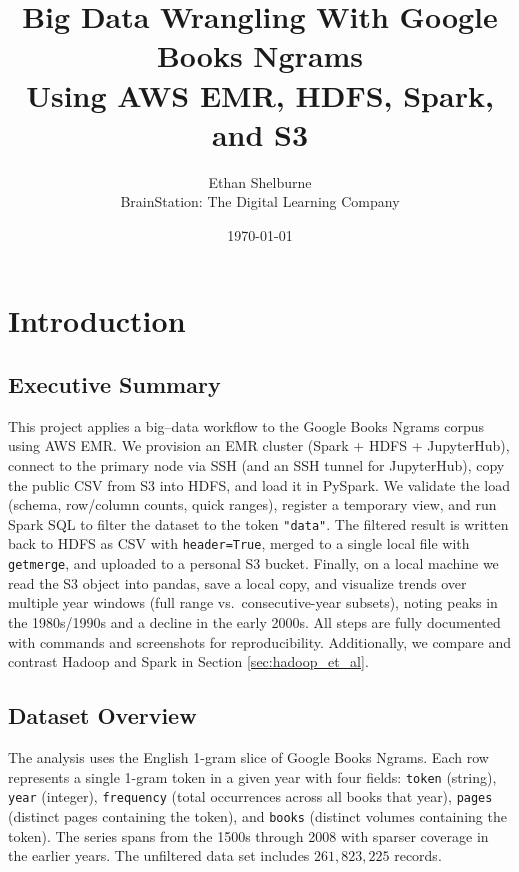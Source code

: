 \documentclass[11pt]{article}
\title{\vspace{-1.5em}\textbf{Big Data Wrangling With Google Books Ngrams}\\\large Using AWS EMR, HDFS, Spark, and S3}
\author{Ethan Shelburne \\ BrainStation: The Digital Learning Company}
\date{\today}
\begin{document}
\maketitle
\thispagestyle{fancy}


\tableofcontents
\listoffigures

\newpage



\section{Introduction}

\subsection{Executive Summary}
\label{sec:exec}
This project applies a big–data workflow to the Google Books Ngrams corpus using AWS EMR. We provision an EMR cluster (Spark + HDFS + JupyterHub), connect to the primary node via SSH (and an SSH tunnel for JupyterHub), copy the public CSV from S3 into HDFS, and load it in PySpark. We validate the load (schema, row/column counts, quick ranges), register a temporary view, and run Spark SQL to filter the dataset to the token \texttt{"data"}. The filtered result is written back to HDFS as CSV with \texttt{header=True}, merged to a single local file with \texttt{getmerge}, and uploaded to a personal S3 bucket. Finally, on a local machine we read the S3 object into pandas, save a local copy, and visualize trends over multiple year windows (full range vs.\ consecutive-year subsets), noting peaks in the 1980s/1990s and a decline in the early 2000s. All steps are fully documented with commands and screenshots for reproducibility. Additionally, we compare and contrast Hadoop and Spark in Section \ref{sec:hadoop_et_al}.

\subsection{Dataset Overview}
\label{sec:data_overview}
The analysis uses the English 1-gram slice of Google Books Ngrams. Each row represents a single 1-gram token in a given year with four fields: \texttt{token} (string), \texttt{year} (integer), \texttt{frequency} (total occurrences across all books that year), \texttt{pages} (distinct pages containing the token), and \texttt{books} (distinct volumes containing the token). The series spans from the 1500s through 2008 with sparser coverage in the earlier years. The unfiltered data set includes $261,823,225$ records.
\end{document}
